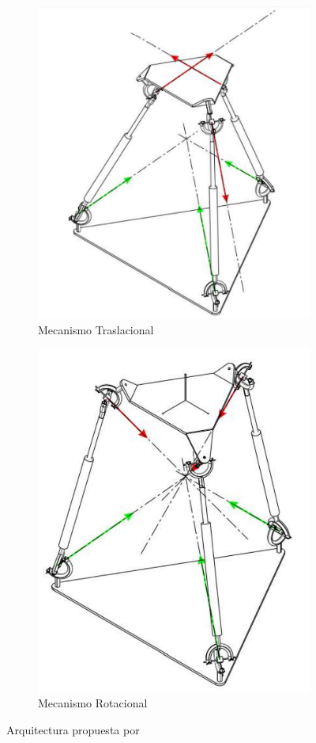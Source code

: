 \begin{figure}
    \centering
    \begin{subfigure}{0.45\textwidth}
        \includegraphics[width=0.9\linewidth]{Cap2_DisenoEspecificaciones/Figura/Sarabandi2018-01.pdf}
        \caption{Mecanismo Traslacional}
        \label{fig:Sarabandi2018-01}
    \end{subfigure}
    \begin{subfigure}{0.45\textwidth}
        \includegraphics[width=0.8\linewidth]{Cap2_DisenoEspecificaciones/Figura/Sarabandi2018-02.pdf}
        \caption{Mecanismo Rotacional}
        \label{fig:Sarabandi2018-02}
    \end{subfigure}
    \caption{Arquitectura propuesta por \cite{sarabandi2018reconfigurable}}
    \label{fig:Sarabandi2018}
\end{figure}

